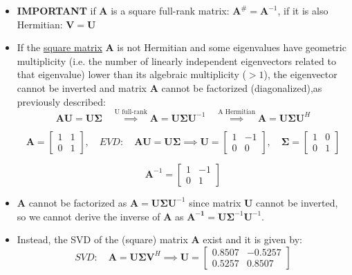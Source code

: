 \begin{itemize}
\[
\underset{L \times N}{\mathbf{A}^{\#}}
\;
\underset{N \times L}{\mathbf{A}}
=
{\mathbf{V}_1 \Sigma_1^{-1} \mathbf{U}_1^H \mathbf{U}_1 \Sigma_1 \mathbf{V}_1^H}
=
{\mathbf{V}_1 \mathbf{V}_1^H}
\neq
\underset{L \times L}{\mathbf{I}}
\quad
\left(
\mathbf{V}_1^H \mathbf{V}_1 = \underset{r \times r}{\mathbf{I}}
\right)
\]
\item \textbf{IMPORTANT} if \textbf{A} is a square full-rank matrix: \(\mathbf{A}^{\#}=\mathbf{A}^{-1}\), if it is also Hermitian: \(\mathbf{V}=\mathbf{U}\)
\item If the \underline{square matrix} \textbf{A} is not Hermitian and some eigenvalues have geometric multiplicity (i.e. the number of linearly independent eigenvectors related to that eigenvalue) lower than its algebraic multiplicity (\(>1\)), the eigenvector cannot be inverted and matrix \textbf{A} cannot be factorized (diagonalized),as previously described:
\[
\boxed{
    \mathbf{A}\mathbf{U} = \mathbf{U}\boldsymbol{\Sigma}
    \quad \overset{\text{U full-rank}}{ \implies }
    \mathbf{A} = \mathbf{U}\boldsymbol{\Sigma}\mathbf{U}^{-1}
    \quad \overset{\text{A Hermitian}}{ \implies}
    \mathbf{A} = \mathbf{U}\boldsymbol{\Sigma}\mathbf{U}^H
}
\]

\[
\mathbf{A} = \begin{bmatrix} 1 & 1 \\ 0 & 1 \end{bmatrix}, 
\quad \textit{EVD}:\quad \mathbf{A}\mathbf{U} = \mathbf{U}\boldsymbol{\Sigma}
\implies
\mathbf{U} = \begin{bmatrix} 1 & -1 \\ 0 & 0 \end{bmatrix},\quad
\boldsymbol{\Sigma} = \begin{bmatrix} 1 & 0 \\ 0 & 1 \end{bmatrix}
\]

\[
\mathbf{A}^{-1} = \begin{bmatrix} 1 & -1 \\ 0 & 1 \end{bmatrix}
\]
\item \textbf{A} cannot be factorized as \(\mathbf{A=U}\boldsymbol{\Sigma}\mathbf{U}^{-1}\) since matrix \textbf{U} cannot be inverted, so we cannot derive the inverse of \textbf{A} as \(\mathbf{A^{-1}=U}\boldsymbol{\Sigma}^{-1}\mathbf{U}^{-1}\).

\item Instead, the SVD of the (square) matrix \textbf{A} exist and it is given by:
\[
\mathit{SVD}: \quad \mathbf{A} = \mathbf{U} \boldsymbol{\Sigma} \mathbf{V}^H
\implies
\mathbf{U} =
\begin{bmatrix}
0.8507 & -0.5257 \\
0.5257 & 0.8507
\end{bmatrix}
\]


\end{itemize}
